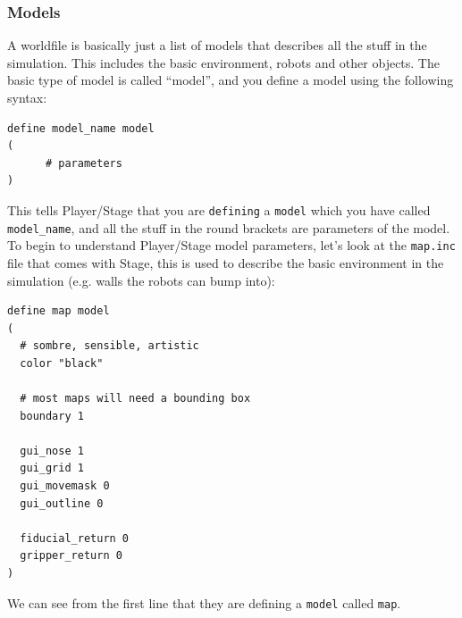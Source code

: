 \documentclass[a4paper]{report}
\newcommand{\plst}{Player/Stage\xspace}
\begin{document}
\subsubsection{Models} \label{sec:models}
A worldfile is basically just a list of models that describes all the stuff in the simulation. This includes the basic environment, robots and other objects. The basic type of model is called ``model'', and you define a model using the following syntax:
\begin{verbatim}
define model_name model
(
      # parameters
)
\end{verbatim}
This tells \plst that you are \verb|defining| a \verb|model| which you have called \verb|model_name|, and all the stuff in the round brackets are parameters of the model. To begin to understand \plst model parameters, let's look at the \verb|map.inc| file that comes with Stage, this is used to describe the basic environment in the simulation (e.g. walls the robots can bump into):
\begin{verbatim}
define map model
(
  # sombre, sensible, artistic
  color "black"

  # most maps will need a bounding box
  boundary 1

  gui_nose 1
  gui_grid 1
  gui_movemask 0
  gui_outline 0
 
  fiducial_return 0
  gripper_return 0
)
\end{verbatim}
We can see from the first line that they are defining a \verb|model| called \verb|map|. 
\end{document}
